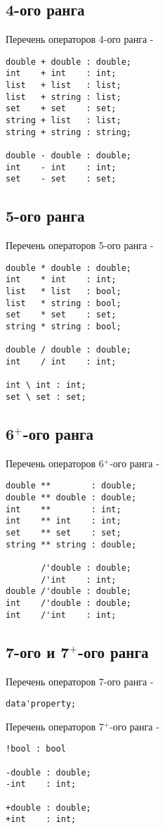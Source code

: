\documentclass[a4paper, 14pt]{extarticle}
\begin{document}
\subsection{4-ого ранга}

\noindent Перечень операторов 4-ого ранга -
\begin{lstlisting}[numbers=none]
double + double : double;
int    + int    : int;
list   + list   : list;
list   + string : list;
set    + set    : set;
string + list   : list;
string + string : string;

double - double : double;
int    - int    : int;
set    - set    : set;
\end{lstlisting}

\subsection{5-ого ранга}

\noindent Перечень операторов 5-ого ранга -
\begin{lstlisting}[numbers=none]
double * double : double;
int    * int    : int;
list   * list   : bool;
list   * string : bool;
set    * set    : set;
string * string : bool;

double / double : double;
int    / int    : int;

int \ int : int;
set \ set : set;
\end{lstlisting}

\subsection{6$^+$-ого ранга}

\noindent Перечень операторов 6$^+$-ого ранга -
\begin{lstlisting}[numbers=none]
double **        : double;
double ** double : double;
int    **        : int;
int    ** int    : int;
set    ** set    : set;
string ** string : double;

       /'double : double;
       /'int    : int;
double /'double : double;
int    /'double : double;
int    /'int    : int;
\end{lstlisting}

\subsection{7-ого и 7$^+$-ого ранга}

\noindent Перечень операторов 7-ого ранга -
\begin{lstlisting}[numbers=none]
data'property;
\end{lstlisting}

\noindent Перечень операторов 7$^+$-ого ранга -
\begin{lstlisting}[numbers=none]
!bool : bool

-double : double;
-int    : int;

+double : double;
+int    : int;
\end{lstlisting}
\end{document}
